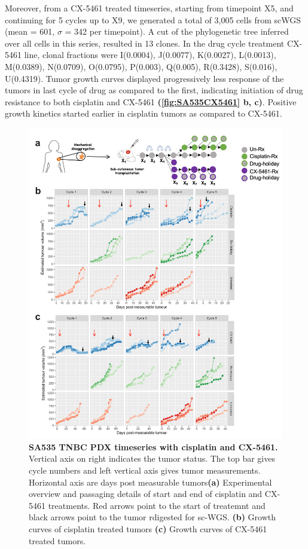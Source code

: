 Moreover, from a CX-5461 treated timeseries, starting from timepoint X5, and continuing for 5 cycles up to X9, we generated a total of 3,005 cells from scWGS (mean = 601, $\sigma$ = 342 per timepoint). A cut of the phylogenetic tree inferred over all cells in this series, resulted in 13 clones. In the drug cycle treatment CX-5461 line, clonal fractions were I(0.0004), J(0.0077), K(0.0027), L(0.0013), M(0.0389), N(0.0709),  O(0.0795), P(0.003), Q(0.005), R(0.3428), S(0.016), U(0.4319).
Tumor growth curves displayed progressively less response of the tumors in last cycle of drug as compared to the first, indicating initiation of drug resistance to both cisplatin and CX-5461 \textbf{(\autoref{fig:SA535CX5461} b, c)}. Positive growth kinetics started earlier in cisplatin tumors as compared to CX-5461.

\begin{figure}
\centering
\includegraphics[width=\textwidth]{Figures/SA535CX5461.pdf}
	
\caption[SA535 TNBC PDX timeseries with cisplatin and CX-5461]
	{\small
 \textbf{SA535 TNBC PDX timeseries with cisplatin and CX-5461.}
Vertical axis on right indicates the tumor status. The top bar gives cycle numbers and left vertical axis gives tumor measurements. Horizontal axis are days post measurable tumors\textbf{(a)} Experimental overview and passaging details of start and end of cisplatin and CX-5461 treatments. Red arrows point to the start of treatemnt and black arrows point to the tumor rdigested for sc-WGS.
	   \textbf{(b)} Growth curves of cisplatin treated tumors
	    \textbf{(c)} Growth curves of CX-5461 treated tumors.
	}
	\label{fig:SA535CX5461}
\end{figure}

